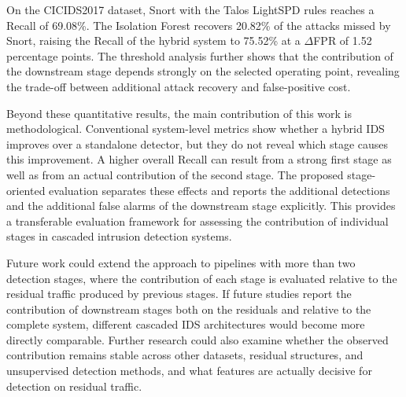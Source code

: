\documentclass[conference]{IEEEtran}
\begin{document}
On the CICIDS2017 dataset, Snort with the Talos LightSPD rules reaches a Recall of 69.08\%. The Isolation Forest recovers 20.82\% of the attacks missed by Snort, raising the Recall of the hybrid system to 75.52\% at a $\Delta$FPR of 1.52 percentage points. 
The threshold analysis further shows that the contribution of the downstream
stage depends strongly on the selected operating point, revealing the trade-off
between additional attack recovery and false-positive cost.

Beyond these quantitative results, the main contribution of this work is methodological. Conventional system-level metrics show whether a hybrid IDS improves over a standalone detector, but they do not reveal which stage causes this improvement. A higher overall Recall can result from a strong first stage as well as from an actual contribution of the second stage. The proposed stage-oriented evaluation separates these effects and reports the additional detections and the additional false alarms of the downstream stage explicitly. This provides a transferable evaluation framework for assessing the contribution of individual stages in cascaded intrusion detection systems.

Future work could extend the approach to pipelines with more than two detection stages, where the contribution of each stage is evaluated relative to the
residual traffic produced by previous stages. If future studies report the contribution of downstream stages both on the residuals and relative to the complete system, different cascaded IDS architectures would become more directly comparable. Further research could also examine whether the observed contribution remains stable across other datasets, residual structures, and unsupervised detection methods, and what features are actually decisive for detection on residual traffic. 




\end{document}
